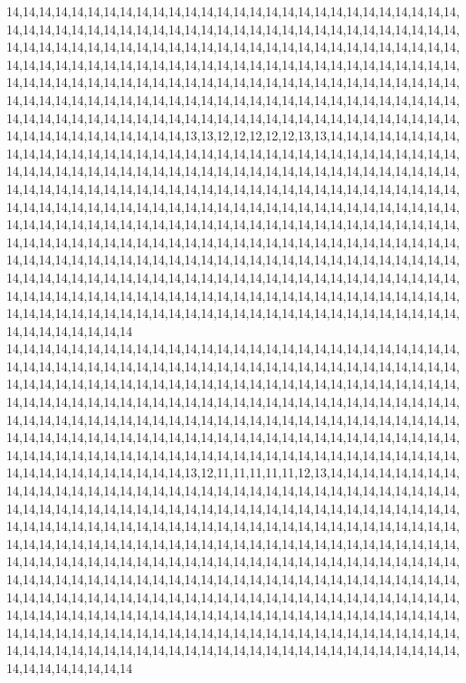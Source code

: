14,14,14,14,14,14,14,14,14,14,14,14,14,14,14,14,14,14,14,14,14,14,14,14,14,14,14,14,14,14,14,14,14,14,14,14,14,14,14,14,14,14,14,14,14,14,14,14,14,14,14,14,14,14,14,14,14,14,14,14,14,14,14,14,14,14,14,14,14,14,14,14,14,14,14,14,14,14,14,14,14,14,14,14,14,14,14,14,14,14,14,14,14,14,14,14,14,14,14,14,14,14,14,14,14,14,14,14,14,14,14,14,14,14,14,14,14,14,14,14,14,14,14,14,14,14,14,14,14,14,14,14,14,14,14,14,14,14,14,14,14,14,14,14,14,14,14,14,14,14,14,14,14,14,14,14,14,14,14,14,14,14,14,14,14,14,14,14,14,14,14,14,14,14,14,14,14,14,14,14,14,14,14,14,14,14,14,14,14,14,14,14,14,14,14,14,14,14,14,14,14,14,14,14,14,14,14,13,13,12,12,12,12,12,13,13,14,14,14,14,14,14,14,14,14,14,14,14,14,14,14,14,14,14,14,14,14,14,14,14,14,14,14,14,14,14,14,14,14,14,14,14,14,14,14,14,14,14,14,14,14,14,14,14,14,14,14,14,14,14,14,14,14,14,14,14,14,14,14,14,14,14,14,14,14,14,14,14,14,14,14,14,14,14,14,14,14,14,14,14,14,14,14,14,14,14,14,14,14,14,14,14,14,14,14,14,14,14,14,14,14,14,14,14,14,14,14,14,14,14,14,14,14,14,14,14,14,14,14,14,14,14,14,14,14,14,14,14,14,14,14,14,14,14,14,14,14,14,14,14,14,14,14,14,14,14,14,14,14,14,14,14,14,14,14,14,14,14,14,14,14,14,14,14,14,14,14,14,14,14,14,14,14,14,14,14,14,14,14,14,14,14,14,14,14,14,14,14,14,14,14,14,14,14,14,14,14,14,14,14,14,14,14,14,14,14,14,14,14,14,14,14,14,14,14,14,14,14,14,14,14,14,14,14,14,14,14,14,14,14,14,14,14,14,14,14,14,14,14,14,14,14,14,14,14,14,14,14,14,14,14,14,14,14,14,14,14,14,14,14,14,14,14,14,14,14,14,14,14,14,14,14,14,14,14,14,14,14,14,14,14,14,14,14,14,14,14,14,14,14,14,14
14,14,14,14,14,14,14,14,14,14,14,14,14,14,14,14,14,14,14,14,14,14,14,14,14,14,14,14,14,14,14,14,14,14,14,14,14,14,14,14,14,14,14,14,14,14,14,14,14,14,14,14,14,14,14,14,14,14,14,14,14,14,14,14,14,14,14,14,14,14,14,14,14,14,14,14,14,14,14,14,14,14,14,14,14,14,14,14,14,14,14,14,14,14,14,14,14,14,14,14,14,14,14,14,14,14,14,14,14,14,14,14,14,14,14,14,14,14,14,14,14,14,14,14,14,14,14,14,14,14,14,14,14,14,14,14,14,14,14,14,14,14,14,14,14,14,14,14,14,14,14,14,14,14,14,14,14,14,14,14,14,14,14,14,14,14,14,14,14,14,14,14,14,14,14,14,14,14,14,14,14,14,14,14,14,14,14,14,14,14,14,14,14,14,14,14,14,14,14,14,14,14,14,14,14,14,14,13,12,11,11,11,11,11,12,13,14,14,14,14,14,14,14,14,14,14,14,14,14,14,14,14,14,14,14,14,14,14,14,14,14,14,14,14,14,14,14,14,14,14,14,14,14,14,14,14,14,14,14,14,14,14,14,14,14,14,14,14,14,14,14,14,14,14,14,14,14,14,14,14,14,14,14,14,14,14,14,14,14,14,14,14,14,14,14,14,14,14,14,14,14,14,14,14,14,14,14,14,14,14,14,14,14,14,14,14,14,14,14,14,14,14,14,14,14,14,14,14,14,14,14,14,14,14,14,14,14,14,14,14,14,14,14,14,14,14,14,14,14,14,14,14,14,14,14,14,14,14,14,14,14,14,14,14,14,14,14,14,14,14,14,14,14,14,14,14,14,14,14,14,14,14,14,14,14,14,14,14,14,14,14,14,14,14,14,14,14,14,14,14,14,14,14,14,14,14,14,14,14,14,14,14,14,14,14,14,14,14,14,14,14,14,14,14,14,14,14,14,14,14,14,14,14,14,14,14,14,14,14,14,14,14,14,14,14,14,14,14,14,14,14,14,14,14,14,14,14,14,14,14,14,14,14,14,14,14,14,14,14,14,14,14,14,14,14,14,14,14,14,14,14,14,14,14,14,14,14,14,14,14,14,14,14,14,14,14,14,14,14,14,14,14,14,14,14,14,14,14,14,14,14,14
